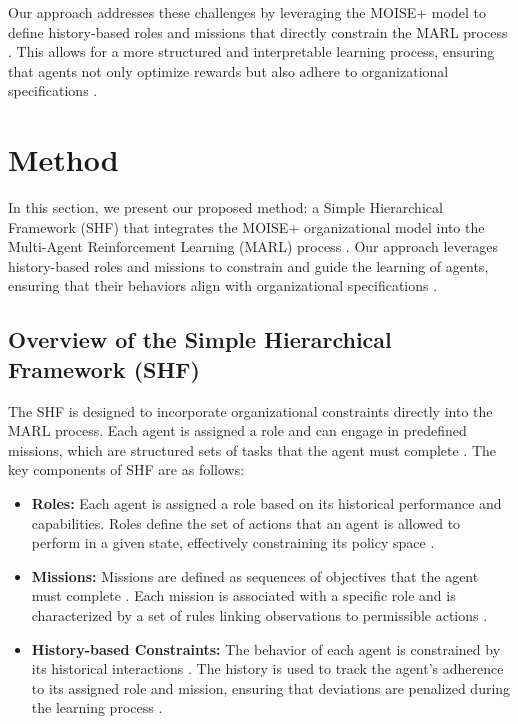 \documentclass[sigconf,anonymous]{aamas}
\begin{document}
Our approach addresses these challenges by leveraging the MOISE+ model to define history-based roles and missions that directly constrain the MARL process \cite{hubner2010moise, soule2024}. This allows for a more structured and interpretable learning process, ensuring that agents not only optimize rewards but also adhere to organizational specifications \cite{hernandez2019survey, wei2019safe}.

\section{Method}
\label{sec:method}

In this section, we present our proposed method: a Simple Hierarchical Framework (SHF) that integrates the MOISE+ organizational model into the Multi-Agent Reinforcement Learning (MARL) process \cite{hubner2010moise}. Our approach leverages history-based roles and missions to constrain and guide the learning of agents, ensuring that their behaviors align with organizational specifications \cite{hubner2007using, soule2024}.

\subsection{Overview of the Simple Hierarchical Framework (SHF)}
The SHF is designed to incorporate organizational constraints directly into the MARL process. Each agent is assigned a role and can engage in predefined missions, which are structured sets of tasks that the agent must complete \cite{hubner2010moise}. The key components of SHF are as follows:

\begin{itemize}
    \item \textbf{Roles:} Each agent is assigned a role based on its historical performance and capabilities. Roles define the set of actions that an agent is allowed to perform in a given state, effectively constraining its policy space \cite{hubner2010moise, castaneda2019policy}.
    \item \textbf{Missions:} Missions are defined as sequences of objectives that the agent must complete \cite{hubner2010moise}. Each mission is associated with a specific role and is characterized by a set of rules linking observations to permissible actions \cite{hernandez2019survey}.
    \item \textbf{History-based Constraints:} The behavior of each agent is constrained by its historical interactions \cite{foerster2018counterfactual}. The history is used to track the agent's adherence to its assigned role and mission, ensuring that deviations are penalized during the learning process \cite{wei2019safe}.
\end{itemize}
\end{document}
